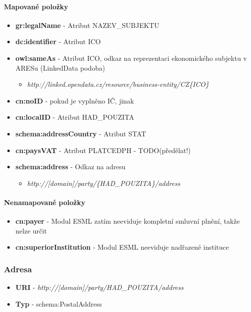 \paragraph*{Mapované položky}
\begin{itemize}
\item \textbf{gr:legalName} - Atribut NAZEV\_SUBJEKTU
\item \textbf{dc:identifier} - Atribut ICO
\item \textbf{owl:sameAs} - Atribut ICO, odkaz na reprezentaci ekonomického subjektu v ARESu (LinkedData podoba)
	\begin{itemize}
	\item \textit{http://linked.opendata.cz/resource/business-entity/CZ\{ICO\}}
	\end{itemize}
\item \textbf{cn:noID} -  pokud je vyplněno IČ, jinak 
\item \textbf{cn:localID} - Atribut HAD\_POUZITA
\item \textbf{schema:addressCountry} - Atribut STAT
\item \textbf{cn:paysVAT} - Atribut PLATCEDPH - TODO(předělat!)
\item \textbf{schema:address} - Odkaz na adresu
	\begin{itemize}
	\item \textit{http://[domain]/party/\{HAD\_POUZITA\}/address}
	\end{itemize}
\end{itemize}

\paragraph*{Nenamapované položky}
\begin{itemize}
\item \textbf{cn:payer} - Modul ESML zatím neeviduje kompletní smluvní plnění, takže nelze určit 
\item \textbf{cn:superiorInstitution} - Modul ESML neeviduje nadřazené instituce
\end{itemize}

\subsubsection{Adresa}

\begin{itemize}
\item \textbf{URI} - \textit{http://[domain]/party/{HAD\_POUZITA}/address}
\item \textbf{Typ} - schema:PostalAddress
\end{itemize}

